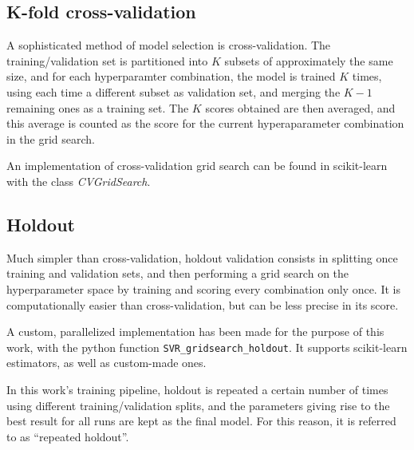 \documentclass[12pt]{report}
\begin{document}
\subsection*{K-fold cross-validation}
A sophisticated method of model selection is cross-validation. The training/validation set is partitioned into $ K $ subsets of approximately the same size, and for each hyperparamter combination, the model is trained $ K $ times, using each time a different subset as validation set, and merging the $ K - 1 $ remaining ones as a training set. The $ K $ scores obtained are then averaged, and this average is counted as the score for the current hyperaparameter combination in the grid search.

An implementation of cross-validation grid search can be found in scikit-learn with the class \textit{CVGridSearch}.

\subsection*{Holdout}
Much simpler than cross-validation, holdout validation consists in splitting once training and validation sets, and then performing a grid search on the hyperparameter space by training and scoring every combination only once. It is computationally easier than cross-validation, but can be less precise in its score.

A custom, parallelized implementation has been made for the purpose of this work, with the python function \texttt{SVR\_gridsearch\_holdout}. It supports scikit-learn estimators, as well as custom-made ones.

In this work's training pipeline, holdout is repeated a certain number of times using different training/validation splits, and the parameters giving rise to the best result for all runs are kept as the final model. For this reason, it is referred to as ``repeated holdout''.
\end{document}
